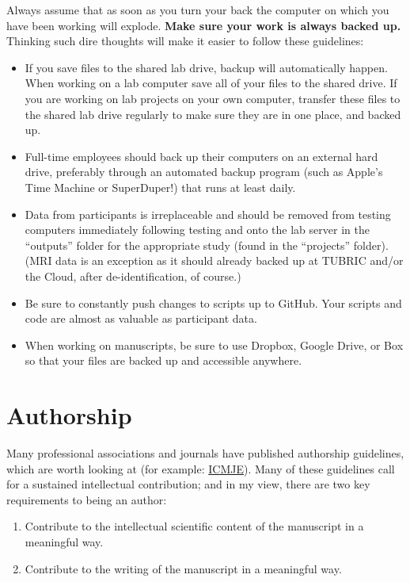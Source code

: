 \documentclass[letterpaper,12pt,oneside]{memoir}
\begin{document}
{Always assume that as soon as you turn your back the computer on which you have been working will explode. \textbf{Make sure your work is always backed up.} Thinking such dire thoughts will make it easier to follow these guidelines:

\begin{itemize}
\item If you save files to the shared lab drive, backup will automatically happen. When working on a lab computer save all of your files to the shared drive. If you are working on lab projects on your own computer, transfer these files to the shared lab drive regularly to make sure they are in one place, and backed up.
\item Full-time employees should back up their computers on an external hard drive, preferably through an automated backup program (such as Apple's Time Machine or SuperDuper!) that runs at least daily.
\item Data from participants is irreplaceable and should be removed from testing computers immediately following testing and onto the lab server in the ``outputs'' folder for the appropriate study (found in the ``projects'' folder). (MRI data is an exception as it should already backed up at TUBRIC and/or the Cloud, after de-identification, of course.)
\item Be sure to constantly push changes to scripts up to GitHub. Your scripts and code are almost as valuable as participant data.
\item When working on manuscripts, be sure to use Dropbox, Google Drive, or Box so that your files are backed up and accessible anywhere.
\end{itemize}


\section{Authorship}
Many professional associations and journals have published authorship guidelines, which are worth looking at (for example: \href{http://www.icmje.org/recommendations/browse/roles-and-responsibilities/defining-the-role-of-authors-and-contributors.html}{ICMJE}). Many of these guidelines call for a sustained intellectual contribution; and in my view, there are two key requirements to being an author:

\begin{enumerate}
\item Contribute to the intellectual scientific content of the manuscript in a meaningful way.
\item Contribute to the writing of the manuscript in a meaningful way.
\end{enumerate}

}
\end{document}
